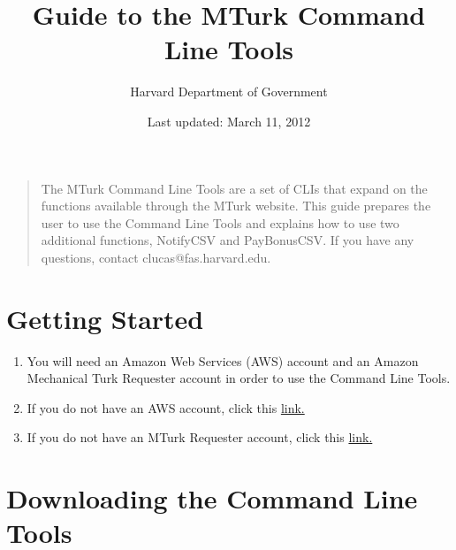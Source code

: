 \documentclass[10pt]{article}
\title{Guide to the MTurk Command Line Tools}
\author{Harvard Department of Government}
\date{Last updated: March 11, 2012}
\begin{document}
\maketitle

\begin{quotation}
The MTurk Command Line Tools are a set of CLIs that expand on the functions available through the MTurk website. This guide prepares the user to use the Command Line Tools and explains how to use two additional functions, NotifyCSV and PayBonusCSV. If you have any questions, contact clucas@fas.harvard.edu.
\end{quotation}

\section*{Getting Started}

\begin{enumerate}
	\item You will need an Amazon Web Services (AWS) account and an Amazon Mechanical Turk Requester account in order to use the Command Line Tools. 
	\item If you do not have an AWS account, click this \href{https://aws-portal.amazon.com/gp/aws/developer/registration/index.html}{link.}
	\item If you do not have an MTurk Requester account, click this \href{https://www.amazon.com/gp/aws/ssop/index.html?awscbctx=&awscbid=1PAVRHWQ0W17WVS868G2&awscredential=&awsnoclientpipeline=true&awsstrict=false&awsturknosubway=true&wa=wsignin1.0&wctx=&wreply=https\%3A\%2F\%2Frequester.mturk.com\%2Fend_signin&wtrealm=1PAVRHWQ0W17WVS868G2&awssig=8EwI\%2FStQzSbYuJTv3SrgxdaEqAA\%3D}{link.}
\end{enumerate}

\section*{Downloading the Command Line Tools}
\end{document}
